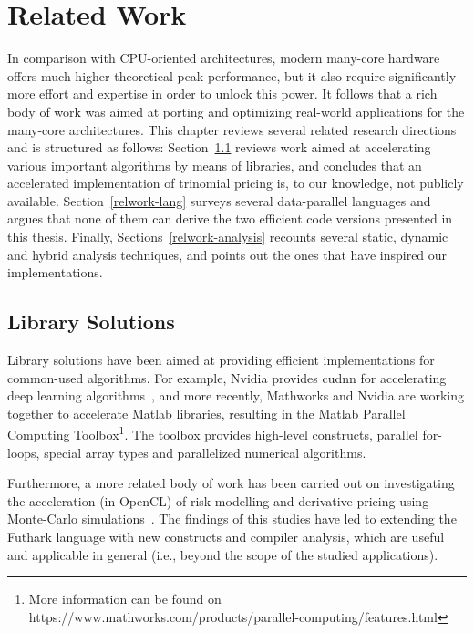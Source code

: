 \chapter{Related Work}
\label{chapter:relatedwork}

In comparison with CPU-oriented architectures, modern many-core hardware offers much higher theoretical peak performance, but it also require significantly more effort and expertise in order to unlock this power.   It follows that a rich body of work was aimed at porting and optimizing real-world applications for the many-core architectures. This chapter reviews several related research directions and is structured as follows: Section~\ref{relwork-lib} reviews work aimed at accelerating various important algorithms by means of libraries, and concludes that an accelerated implementation of trinomial pricing is, to our knowledge, not publicly available. Section~\ref{relwork-lang} surveys several data-parallel languages and argues that none of them can derive the two efficient code versions presented in this thesis. Finally, Sections~\ref{relwork-analysis} recounts several static, dynamic and hybrid analysis techniques, and points out the ones that have inspired our implementations.

\section{Library Solutions}
\label{relwork-lib}

Library solutions have been aimed at providing efficient implementations for common-used algorithms. For example, Nvidia provides {\sc cudnn} for accelerating deep learning algorithms~\cite{cudnn}, and more recently, Mathworks and Nvidia are working together to accelerate Matlab libraries, resulting in the Matlab Parallel Computing Toolbox\footnote{More information can be found on https://www.mathworks.com/products/parallel-computing/features.html}. The toolbox provides high-level constructs, parallel for-loops, special array types and parallelized numerical algorithms.   

Furthermore, a more related body of work has been carried out on investigating the acceleration (in OpenCL) of risk modelling and derivative pricing using Monte-Carlo simulations~\cite{FinPar:TACO,LexiFiPricing}. The findings of this studies have led to extending the Futhark language with new constructs and compiler analysis, which are useful and applicable in general (i.e., beyond the scope of the studied applications).


